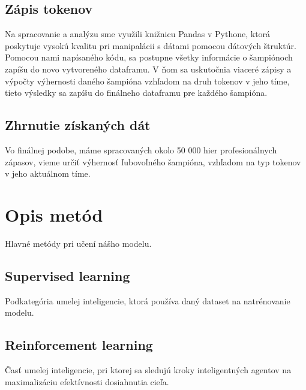 \subsection{Zápis tokenov}
Na spracovanie a analýzu sme využili knižnicu Pandas v Pythone, ktorá poskytuje vysokú kvalitu pri manipalácii s dátami pomocou dátových štruktúr. Pomocou nami napísaného kódu, sa postupne všetky informácie o šampiónoch zapíšu do novo vytvoreného dataframu. V ňom sa uskutočnia viaceré zápisy a výpočty výhernosti daného šampióna vzhľadom na druh tokenov v jeho tíme, tieto výsledky sa zapíšu do finálneho dataframu pre každého šampióna.
\subsection{Zhrnutie získaných dát}
Vo finálnej podobe, máme spracovaných okolo 50 000 hier profesionálnych zápasov, vieme určiť výhernosť ľubovoľného šampióna, vzhľadom na typ tokenov v jeho aktuálnom tíme.
\section{Opis metód}
Hlavné metódy pri učení nášho modelu.
\subsection{Supervised learning}
Podkategória umelej inteligencie, ktorá používa daný dataset na natrénovanie modelu.

\subsection{Reinforcement learning}
Časť umelej inteligencie, pri ktorej sa sledujú kroky inteligentných agentov na maximalizáciu efektívnosti dosiahnutia cieľa.
